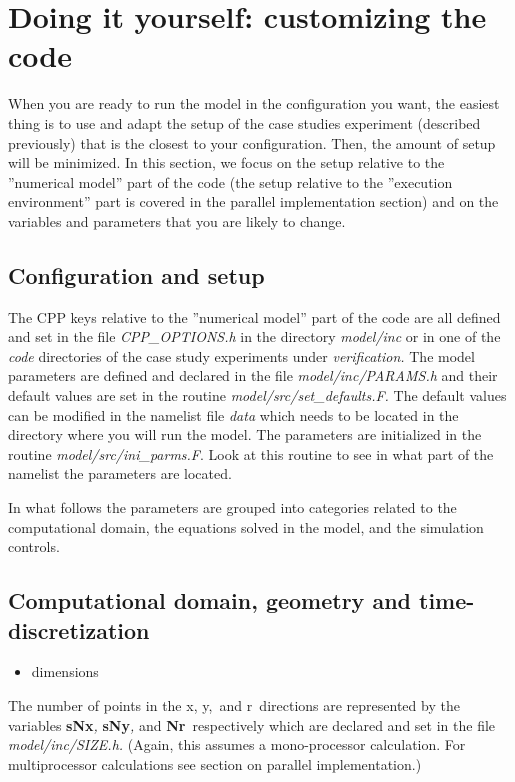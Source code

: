 \section{Doing it yourself: customizing the code}

When you are ready to run the model in the configuration you want, the
easiest thing is to use and adapt the setup of the case studies experiment
(described previously) that is the closest to your configuration. Then, the
amount of setup will be minimized. In this section, we focus on the setup
relative to the ''numerical model'' part of the code (the setup relative to
the ''execution environment'' part is covered in the parallel implementation
section) and on the variables and parameters that you are likely to change.

\subsection{Configuration and setup}

The CPP keys relative to the ''numerical model'' part of the code are all
defined and set in the file \textit{CPP\_OPTIONS.h }in the directory \textit{%
model/inc }or in one of the \textit{code }directories of the case study
experiments under \textit{verification.} The model parameters are defined
and declared in the file \textit{model/inc/PARAMS.h }and their default
values are set in the routine \textit{model/src/set\_defaults.F. }The
default values can be modified in the namelist file \textit{data }which
needs to be located in the directory where you will run the model. The
parameters are initialized in the routine \textit{model/src/ini\_parms.F}.
Look at this routine to see in what part of the namelist the parameters are
located.

In what follows the parameters are grouped into categories related to the
computational domain, the equations solved in the model, and the simulation
controls.

\subsection{Computational domain, geometry and time-discretization}

\begin{itemize}
\item dimensions
\end{itemize}

The number of points in the x, y,\textit{\ }and r\textit{\ }directions are
represented by the variables \textbf{sNx}\textit{, }\textbf{sNy}\textit{, }%
and \textbf{Nr}\textit{\ }respectively which are declared and set in the
file \textit{model/inc/SIZE.h. }(Again, this assumes a mono-processor
calculation. For multiprocessor calculations see section on parallel
implementation.)

